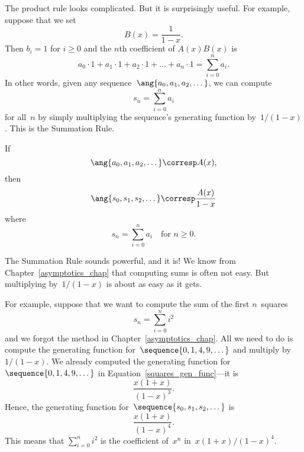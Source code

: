 The product rule looks complicated.  But it is surprisingly useful.
For example, suppose that we set
\begin{equation*}
    B(x) = \frac{1}{1 - x}.
\end{equation*}
Then $b_i = 1$ for $i \ge 0$ and the $n$th coefficient of $A(x) B(x)$
is
\begin{equation*}
a_0 \cdot 1 + a_1 \cdot 1 + a_2 \cdot 1 + \dots + a_n \cdot 1
    = \sum_{i = 0}^n a_i.
\end{equation*}
In other words, given any sequence~$\ang{a_0, a_1, a_2, \dots}$, we can
compute
\begin{equation*}
    s_n = \sum_{i = 0}^n a_i
\end{equation*}
for all~$n$ by simply multiplying the sequence's generating function
by~$1/(1 - x)$.  This is the Summation Rule.

\begin{rul}
If
\begin{equation*}
    \ang{a_0, a_1, a_2, \dots} \corresp A(x),
\end{equation*}
then
\begin{equation*}
    \ang{s_0, s_1, s_2, \dots} \corresp \frac{A(x)}{1 - x}
\end{equation*}
where
\begin{equation*}
    s_n = \sum_{i = 0}^n a_i\quad\text{for $n \ge 0$}.
\end{equation*}
\end{rul}

The Summation Rule sounds powerful, and it is!  We know from
Chapter~\ref{asymptotics_chap} that computing sums is often not easy.
But multiplying by~$1/(1 - x)$ is about as easy as it gets.

For example, suppose that we want to compute the sum of the first
$n$~squares
\begin{equation*}
    s_n = \sum_{i = 0}^n i^2
\end{equation*}
and we forgot the method in Chapter~\ref{asymptotics_chap}.  All we
need to do is compute the generating function for~$\sequence{0, 1, 4,
  9, \dots}$ and multiply by~$1/(1 - x)$.  We already computed the
generating function for ~$\sequence{0, 1, 4, 9, \dots}$ in
Equation~\ref{squares_gen_func}---it is
\begin{equation*}
    \frac{x (1 + x)}{(1 - x)^3}.
\end{equation*}
Hence, the generating function for~$\sequence{s_0, s_1, s_2, \dots}$
is
\begin{equation*}
    \frac{x (1 + x)}{(1 - x)^4}.
\end{equation*}
This means that $\sum_{i = 0}^n i^2$ is the coefficient of~$x^n$ in~$x
(1 + x)/(1 - x)^4$.

